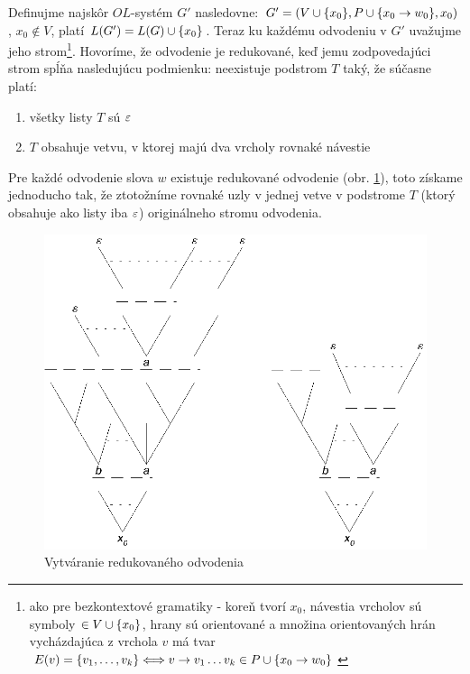 \begin{dokaz}
  Definujme najskôr $OL$-systém $G'$ nasledovne:
  $G'=(V\cup\{x_0\},P\cup\{x_0\rightarrow w_0\},x_0)$, $x_0\not\in V$, platí
  $L(G')=L(G)\cup \{x_0\}$. Teraz ku každému odvodeniu v $G'$
  uvažujme jeho strom\footnote{ako pre bezkontextové gramatiky -
  koreň tvorí $x_0$,  návestia vrcholov sú symboly $\in
  V\cup\{x_0\}$, hrany sú orientované a množina orientovaných hrán
  vycházdajúca z vrchola $v$ má tvar
  $E(v)=\{v_1,\dots,v_k\}\Longleftrightarrow v\rightarrow v_1\dots v_k\in
  P\cup\{x_0\rightarrow w_0\}$}. Hovoríme, že odvodenie je redukované, keď
  jemu zodpovedajúci strom spĺňa nasledujúcu podmienku: neexistuje
  podstrom $T$ taký, že súčasne platí:
  \begin{enumerate}
    \item všetky listy $T$ sú $\varepsilon$
    \item $T$ obsahuje vetvu, v ktorej majú dva vrcholy rovnaké
      návestie
  \end{enumerate}
  Pre každé odvodenie slova $w$ existuje redukované odvodenie (obr.
  \ref{strom}), toto získame jednoducho tak, že ztotožníme rovnaké
  uzly v jednej vetve v podstrome $T$ (ktorý obsahuje ako listy iba
  $\varepsilon$) originálneho stromu odvodenia.

  \begin{figure}[!ht]
    \centering
    \includegraphics{img/stromy}
    \caption{Vytváranie redukovaného odvodenia} \label{strom}
  \end{figure}


\end{dokaz}
